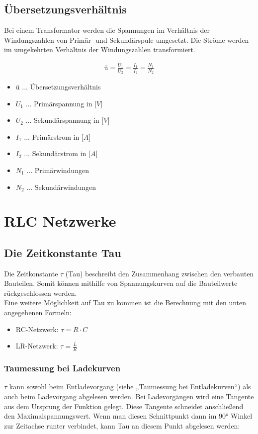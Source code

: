 \subsection{Übersetzungsverhältnis}

Bei einem Transformator werden die Spannungen im Verhältnis der Windungszahlen von Primär- und Sekundärspule umgesetzt. Die Ströme werden im umgekehrten Verhältnis der Windungszahlen transformiert.

\begin{align}
    \text{ü} = \frac{U_1}{U_2} = \frac{I_1}{I_2} = \frac{N_1}{N_2}
\end{align}
\begin{itemize}
    \item ü ... Übersetzungsverhältnis
    \item $U_1$ ... Primärspannung in [$V$]
    \item $U_2$ ... Sekundärspannung in [$V$]
    \item $I_1$ ... Primärstrom in [$A$]
    \item $I_2$ ... Sekundärstrom in [$A$]
    \item $N_1$ ... Primärwindungen
    \item $N_2$ ... Sekundärwindungen
\end{itemize}

\newpage

\section{RLC Netzwerke}
\subsection{Die Zeitkonstante Tau}
Die Zeitkonstante $\tau$ (Tau) beschreibt den Zusammenhang zwischen den verbauten Bauteilen. Somit können mithilfe von Spannungskurven auf die Bauteilwerte rückgeschlossen werden. \\
Eine weitere Möglichkeit auf Tau zu kommen ist die Berechnung mit den unten angegebenen Formeln:
\begin{itemize}
    \item RC-Netzwerk: {\large $\tau = R\cdot C$}
    \item LR-Netzwerk: {\large $\tau = \frac{L}{R}$}
\end{itemize}
\subsubsection{Taumessung bei Ladekurven}
$\tau$ kann sowohl beim Entladevorgang (siehe „Taumessung bei Entladekurven“) als auch beim Ladevorgang abgelesen werden. Bei Ladevorgängen wird eine Tangente aus dem Ursprung der Funktion gelegt. Diese Tangente schneidet anschließend den Maximalspannungswert. Wenn man diesen Schnittpunkt dann im 90° Winkel zur Zeitachse runter verbindet, kann Tau an diesem Punkt abgelesen werden:
